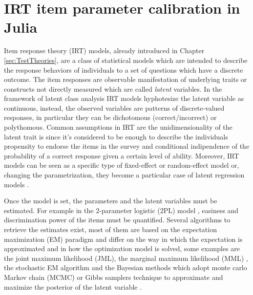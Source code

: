 \chapter{IRT item parameter calibration in Julia} %
\label{sec:Julia}

Item response theory (IRT) models, already introduced in Chapter \ref{sec:TestTheories}, are a class of statistical models which are intended to describe the response behaviors of individuals to a set of questions which have a discrete outcome. The item responses are observable manifestation of underlying traits or constructs not directly measured which are called \emph{latent} variables. In the framework of latent class analysis IRT models hyphotesize the latent variable as continuous, instead, the observed variables are patterns of discrete-valued responses, in particular they can be dichotomous (correct/incorrect) or polythomous. Common assumptions in IRT are the unidimensionality of the latent trait is  since it's considered to be enough to describe the individuals propensity to endorse the items in the survey and conditional indipendence of the probability of a correct response given a certain level of ability. Moreover, IRT models can be seen as a specific type of fixed-effect or random-effect model \parencite{fox2006fixed} or, changing the parametrization, they become a particular case of latent regression models \parencite{von2010stochastic}. 

Once the model is set, the parameters and the latent variables must be estimated. For example in the 2-parameter logistic (2PL) model \parencite{BockMislevy1982}, easiness and discrimination power of the items must be quantified. Several algorithms to retrieve the estimates exist, most of them are based on the expectation maximization (EM) paradigm and differ on the way in which the expectation is approximated and in how the optimization model is solved, some examples are the joint maximum likelihood (JML)\parencite{lord1968statistical}, the marginal maximum likelihood (MML) \parencite{drasgow1989evaluation}, the stochastic EM algorithm \parencite{fox2003stochastic} and the Bayesian methods which adopt monte carlo Markov chain (MCMC) or Gibbs samplers technique to approximate and maximize the posterior of the latent variable \parencite{matteucci2012prior}. 

